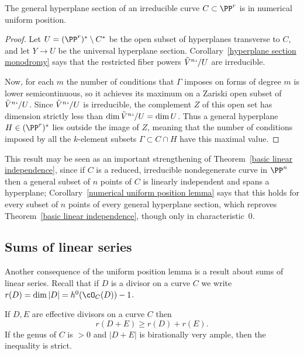 \begin{corollary}\label{numerical
uniform position lemma}
The general hyperplane section of an irreducible curve
%
$C\subset \PP^r$ is in numerical uniform position.
\unif
\end{corollary}

\begin{proof} Let $U = (\PP^r)^* \setminus C^*$ be the open subset
of hyperplanes transverse to $C$, and let $Y\to U$ be the universal
hyperplane section.
Corollary~\ref{hyperplane section monodromy} says that the restricted
fiber powers $\tilde V^n`/U$ are irreducible.

Now, for each $m$ the number of conditions that $\Gamma$ imposes on
forms of degree $m$ is lower semicontinuous, so it achieves its maximum
on a Zariski open subset of $\tilde V^n`/U$. Since $\tilde V^n`/U$ is
irreducible, the complement $Z$ of this open set has dimension strictly
less than $\dim \tilde V^n`/U = \dim U$. Thus a general hyperplane $H
\in (\PP^r)^*$  lies outside the image of $Z$, meaning that the number
of conditions imposed by all the $k$-element subsets $\Gamma \subset C
\cap H$ have this maximal value.
\end{proof}

This result may be seen as an important strengthening of
Theorem~\ref{basic linear independence}, since if $C$ is a reduced,
irreducible nondegenerate curve in $\PP^n$ then a general subset
of $n$ points of $C$ is linearly independent and spans a hyperplane;
Corollary~\ref{numerical uniform position lemma} says that this
holds
for every subset of $n$ points of every general hyperplane section,
which reproves Theorem~\ref{basic linear independence}, though only in
characteristic~0.

\subsection*{Sums of linear series}

Another consequence of the uniform position lemma is a result about sums
%
of linear series.
Recall that if $D$ is a divisor on a curve $C$ we write $r(D) = \dim |D|
= h^0(\cO_C(D))-1$.

\begin{corollary}\label{Clifford equality plus}
If $D,E$ are effective divisors on a curve $C$ then
$$
r(D+E) \geq r(D)+r(E).
$$
If the genus of $C$ is $>0$ and $|D+E|$ is
birationally very ample,
%
%
then the inequality is strict.
\end{corollary}

